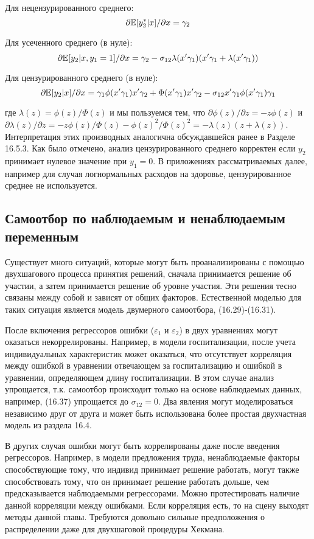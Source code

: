 Для нецензурированного среднего:
\begin{equation}
\partial \mathbb{E}[y^*_2|x] /\partial x=\gamma_2
\end{equation}

Для усеченного среднего (в нуле):
\[
\partial \mathbb{E}[y_2|x,y_1=1] /\partial x=\gamma_2-\sigma_{12}\lambda(x'\gamma_1)(x'\gamma_1+\lambda(x'\gamma_1))
\]

Для цензурированного среднего (в нуле):
\[
\partial \mathbb{E}[y_2|x] /\partial x=\gamma_1 \phi(x'\gamma_1)x'\gamma_2+
\Phi(x'\gamma_1)x'\gamma_2-\sigma_{12}x'\gamma_1 \phi(x'\gamma_1)\gamma_1
\]

где $\lambda(z)=\phi(z)/\Phi(z)$ и мы пользуемся тем, что $\partial \phi(z)/\partial z=-z\phi(z)$ и $\partial \lambda(z)/\partial z=-z\phi(z)/\Phi(z)-\phi(z)^2/\Phi(z)^2=-\lambda(z)(z+\lambda(z))$. Интерпретация этих производных аналогична обсуждавшейся ранее в Разделе 16.5.3. Как было отмечено, анализ цензурированного среднего корректен если $y_2$ принимает нулевое значение при $y_1=0$. В приложениях рассматриваемых далее, например для случая логнормальных расходов на здоровье, цензурированное среднее не используется.

\subsection{Самоотбор по наблюдаемым и ненаблюдаемым переменным}

Существует много ситуаций, которые могут быть проанализированы с помощью двухшагового процесса принятия решений, сначала принимается решение об участии, а затем принимается решение об уровне участия. Эти решения тесно связаны между собой и зависят от общих факторов. Естественной моделью для таких ситуация является модель двумерного самоотбора, (16.29)-(16.31).

После включения регрессоров ошибки ($\varepsilon_1$ и $\varepsilon_2$) в двух уравнениях могут оказаться некоррелированы. Например, в модели госпитализации, после учета индивидуальных характеристик может оказаться, что отсутствует корреляция между ошибкой в уравнении отвечающем за госпитализацию и ошибкой в уравнении, определяющем длину госпитализации. В этом случае анализ упрощается, т.к. самоотбор происходит только на основе наблюдаемых данных, например, (16.37) упрощается до $\sigma_{12}=0$. Два явления могут моделироваться независимо друг от друга и может быть использована более простая двухчастная модель из раздела 16.4.

В других случая ошибки могут быть коррелированы даже после введения регрессоров. Например, в модели предложения труда, ненаблюдаемые факторы способствующие тому, что индивид принимает решение работать, могут также способствовать тому, что он принимает решение работать дольше, чем предсказывается наблюдаемыми регрессорами. Можно протестировать наличие данной корреляции между ошибками. Если корреляция есть, то на сцену выходят методы данной главы. Требуются довольно сильные предположения о распределении даже для двухшаговой процедуры Хекмана.

